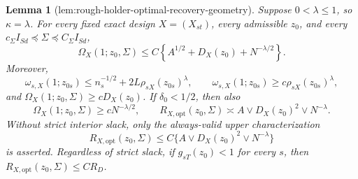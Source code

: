 \documentclass{article}
\newtheorem{lemma}{Lemma}
\begin{document}
\begin{lemma}[lem:rough-holder-optimal-recovery-geometry]\label{lem:rough-holder-optimal-recovery-geometry}
Suppose \(0<\lambda\le1\), so \(\kappa=\lambda\).  For every fixed exact
design \(X=(X_{st})\), every admissible \(z_0\), and every
\(c_\Sigma I_{Sd}\preceq\Sigma\preceq C_\Sigma I_{Sd}\),
\[
 \Omega_X(1;z_0,\Sigma)
 \le C\left\{A^{1/2}+D_X(z_0)+N^{-\lambda/2}\right\}.
\]
Moreover,
\[
 \omega_{s,X}(1;z_{0s})
 \le n_s^{-1/2}+2L\rho_{sX}(z_{0s})^\lambda,
 \qquad
 \omega_{s,X}(1;z_{0s})\ge c\rho_{sX}(z_{0s})^\lambda,
\]
and \(\Omega_X(1;z_0,\Sigma)\ge cD_X(z_0)\).  If
\(\delta_0<1/2\), then also
\[
 \Omega_X(1;z_0,\Sigma)\ge cN^{-\lambda/2},
 \qquad
 R_{X,\mathrm{opt}}(z_0,\Sigma)
 \asymp A\vee D_X(z_0)^2\vee N^{-\lambda}.
\]
Without strict interior slack, only the always-valid upper characterization
\[
 R_{X,\mathrm{opt}}(z_0,\Sigma)
 \le C\{A\vee D_X(z_0)^2\vee N^{-\lambda}\}
\]
is asserted.  Regardless of strict slack, if \(g_{sT}(z_0)<1\) for every
\(s\), then \(R_{X,\mathrm{opt}}(z_0,\Sigma)\le CR_D\).
\end{lemma}
\end{document}
